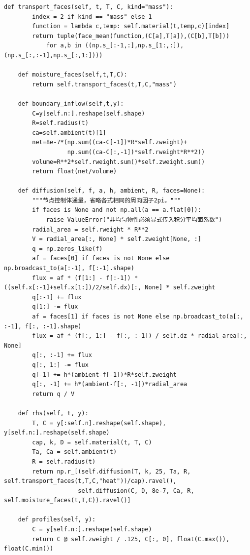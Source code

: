 \documentclass[12pt,a4paper]{ctexart}
\begin{document}
\begin{lstlisting}[caption={solve\_problem4.py }]
    def transport_faces(self, t, T, C, kind="mass"):
        index = 2 if kind == "mass" else 1
        function = lambda c,temp: self.material(t,temp,c)[index]
        return tuple(face_mean(function,(C[a],T[a]),(C[b],T[b]))
            for a,b in ((np.s_[:-1,:],np.s_[1:,:]),(np.s_[:,:-1],np.s_[:,1:])))

    def moisture_faces(self,t,T,C):
        return self.transport_faces(t,T,C,"mass")

    def boundary_inflow(self,t,y):
        C=y[self.n:].reshape(self.shape)
        R=self.radius(t)
        ca=self.ambient(t)[1]
        net=8e-7*(np.sum((ca-C[-1])*R*self.zweight)+
                  np.sum((ca-C[:,-1])*self.rweight*R**2))
        volume=R**2*self.rweight.sum()*self.zweight.sum()
        return float(net/volume)

    def diffusion(self, f, a, h, ambient, R, faces=None):
        """节点控制体通量，省略各式相同的周向因子2pi。"""
        if faces is None and not np.all(a == a.flat[0]):
            raise ValueError("非均匀物性必须显式传入积分平均面系数")
        radial_area = self.rweight * R**2
        V = radial_area[:, None] * self.zweight[None, :]
        q = np.zeros_like(f)
        af = faces[0] if faces is not None else np.broadcast_to(a[:-1], f[:-1].shape)
        flux = af * (f[1:] - f[:-1]) * ((self.x[:-1]+self.x[1:])/2/self.dx)[:, None] * self.zweight
        q[:-1] += flux
        q[1:] -= flux
        af = faces[1] if faces is not None else np.broadcast_to(a[:, :-1], f[:, :-1].shape)
        flux = af * (f[:, 1:] - f[:, :-1]) / self.dz * radial_area[:, None]
        q[:, :-1] += flux
        q[:, 1:] -= flux
        q[-1] += h*(ambient-f[-1])*R*self.zweight
        q[:, -1] += h*(ambient-f[:, -1])*radial_area
        return q / V

    def rhs(self, t, y):
        T, C = y[:self.n].reshape(self.shape), y[self.n:].reshape(self.shape)
        cap, k, D = self.material(t, T, C)
        Ta, Ca = self.ambient(t)
        R = self.radius(t)
        return np.r_[(self.diffusion(T, k, 25, Ta, R, self.transport_faces(t,T,C,"heat"))/cap).ravel(),
                     self.diffusion(C, D, 8e-7, Ca, R, self.moisture_faces(t,T,C)).ravel()]

    def profiles(self, y):
        C = y[self.n:].reshape(self.shape)
        return C @ self.zweight / .125, C[:, 0], float(C.max()), float(C.min())


\end{lstlisting}
\end{document}
